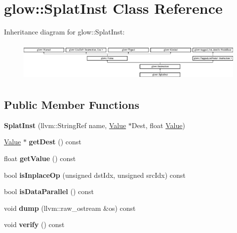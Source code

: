 \hypertarget{classglow_1_1_splat_inst}{}\section{glow\+:\+:Splat\+Inst Class Reference}
\label{classglow_1_1_splat_inst}
Inheritance diagram for glow\+:\+:Splat\+Inst\+:\begin{figure}[H]
\begin{center}
\leavevmode
\includegraphics[height=1.991111cm]{classglow_1_1_splat_inst}
\end{center}
\end{figure}
\subsection*{Public Member Functions}
\begin{DoxyCompactItemize}
\item 
\mbox{\label{classglow_1_1_splat_inst_a21206d6da75a35709a7ec1c596f79f0f}} 
{\bfseries Splat\+Inst} (llvm\+::\+String\+Ref name, \hyperlink{classglow_1_1_value}{Value} $\ast$Dest, float \hyperlink{classglow_1_1_value}{Value})
\item 
\mbox{\label{classglow_1_1_splat_inst_a785592b28e9e6c4d209e9850eab8b064}} 
\hyperlink{classglow_1_1_value}{Value} $\ast$ {\bfseries get\+Dest} () const
\item 
\mbox{\label{classglow_1_1_splat_inst_aff489b810d82fe2f77a4395e6a0729ea}} 
float {\bfseries get\+Value} () const
\item 
\mbox{\label{classglow_1_1_splat_inst_a252ec75d9452ac3afd00a7e17d529ebd}} 
bool {\bfseries is\+Inplace\+Op} (unsigned dst\+Idx, unsigned src\+Idx) const
\item 
\mbox{\label{classglow_1_1_splat_inst_a9b6f49af3db91b09220d342f80040d2f}} 
bool {\bfseries is\+Data\+Parallel} () const
\item 
\mbox{\label{classglow_1_1_splat_inst_a29be99be10840397abf3ebf27152ee69}} 
void {\bfseries dump} (llvm\+::raw\+\_\+ostream \&os) const
\item 
\mbox{\label{classglow_1_1_splat_inst_aefe12adb1b796156282c58a6dd8f7a8f}} 
void {\bfseries verify} () const
\end{DoxyCompactItemize}
